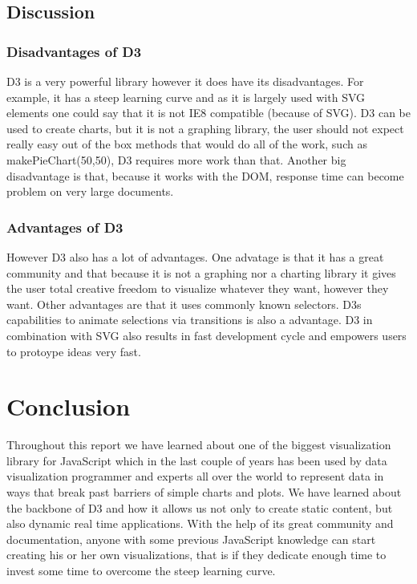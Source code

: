 \documentclass{bioinfo}
\begin{document}
\subsection{Discussion}
\subsubsection{Disadvantages of D3}
\hfill \break
D3 is a very powerful library however it does have its disadvantages. For example, it has a steep learning curve and as it is largely used with SVG elements one could say that it is not IE8 compatible (because of SVG).
D3 can be used to create charts, but it is not a graphing library, the user should not expect really easy out of the box methods that would do all of the work, such as makePieChart(50,50), D3 requires more work than that. Another big disadvantage is that, because it works with the DOM, response time can become problem on very large documents.

\subsubsection{Advantages of D3}
\hfill \break
However D3 also has a lot of advantages. One advatage is that it has a great community and that because it is not a graphing nor a charting library it gives the user total creative freedom to visualize whatever they want, however they want. Other advantages are that it uses commonly known selectors.
D3s capabilities to animate selections via transitions is also a advantage.
D3 in combination with SVG also results in fast development cycle and empowers users to protoype ideas very fast.


\section{Conclusion}
Throughout this report we have learned about one of the biggest visualization library for JavaScript which in the last couple of years has been used by data visualization programmer and experts all over the world to represent data in ways that break past barriers of simple charts and plots.
We have learned about the backbone of D3 and how it allows us not only to create static content, but also dynamic real time applications. With the help of its great community and documentation, anyone with some previous JavaScript knowledge can start creating his or her own visualizations, that is if they dedicate enough time to invest some time to overcome the steep learning curve.
\end{document}
